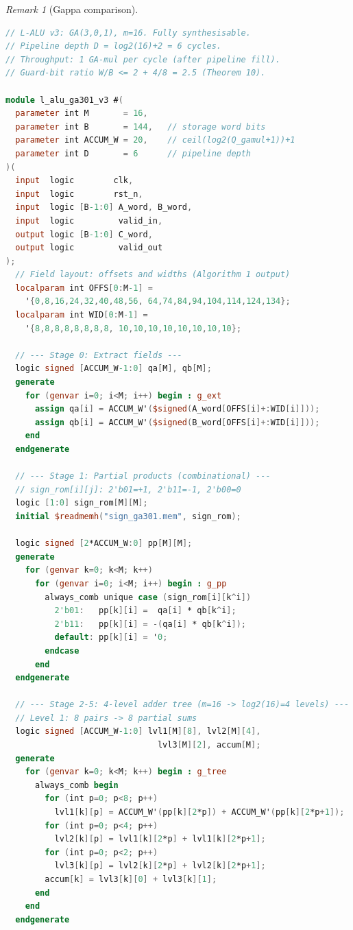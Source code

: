 \documentclass[11pt,a4paper]{article}
\theoremstyle{definition}
\theoremstyle{plain}
\theoremstyle{remark}
\newtheorem{remark}{Remark}[section]
\newcommand{\GA}{\mathbb{G}}
\begin{document}
\begin{remark}[Gappa comparison]
\begin{lstlisting}[language=Verilog,
  caption={L-ALU tile $\GA(3,0,1)$, $m=16$, pipelined, synthesisable},
  label=lst:verilog-v3]
// L-ALU v3: GA(3,0,1), m=16. Fully synthesisable.
// Pipeline depth D = log2(16)+2 = 6 cycles.
// Throughput: 1 GA-mul per cycle (after pipeline fill).
// Guard-bit ratio W/B <= 2 + 4/8 = 2.5 (Theorem 10).

module l_alu_ga301_v3 #(
  parameter int M       = 16,
  parameter int B       = 144,   // storage word bits
  parameter int ACCUM_W = 20,    // ceil(log2(Q_gamul+1))+1
  parameter int D       = 6      // pipeline depth
)(
  input  logic        clk,
  input  logic        rst_n,
  input  logic [B-1:0] A_word, B_word,
  input  logic         valid_in,
  output logic [B-1:0] C_word,
  output logic         valid_out
);
  // Field layout: offsets and widths (Algorithm 1 output)
  localparam int OFFS[0:M-1] =
    '{0,8,16,24,32,40,48,56, 64,74,84,94,104,114,124,134};
  localparam int WID[0:M-1] =
    '{8,8,8,8,8,8,8,8, 10,10,10,10,10,10,10,10};

  // --- Stage 0: Extract fields ---
  logic signed [ACCUM_W-1:0] qa[M], qb[M];
  generate
    for (genvar i=0; i<M; i++) begin : g_ext
      assign qa[i] = ACCUM_W'($signed(A_word[OFFS[i]+:WID[i]]));
      assign qb[i] = ACCUM_W'($signed(B_word[OFFS[i]+:WID[i]]));
    end
  endgenerate

  // --- Stage 1: Partial products (combinational) ---
  // sign_rom[i][j]: 2'b01=+1, 2'b11=-1, 2'b00=0
  logic [1:0] sign_rom[M][M];
  initial $readmemh("sign_ga301.mem", sign_rom);

  logic signed [2*ACCUM_W:0] pp[M][M];
  generate
    for (genvar k=0; k<M; k++)
      for (genvar i=0; i<M; i++) begin : g_pp
        always_comb unique case (sign_rom[i][k^i])
          2'b01:   pp[k][i] =  qa[i] * qb[k^i];
          2'b11:   pp[k][i] = -(qa[i] * qb[k^i]);
          default: pp[k][i] = '0;
        endcase
      end
  endgenerate

  // --- Stage 2-5: 4-level adder tree (m=16 -> log2(16)=4 levels) ---
  // Level 1: 8 pairs -> 8 partial sums
  logic signed [ACCUM_W-1:0] lvl1[M][8], lvl2[M][4],
                               lvl3[M][2], accum[M];
  generate
    for (genvar k=0; k<M; k++) begin : g_tree
      always_comb begin
        for (int p=0; p<8; p++)
          lvl1[k][p] = ACCUM_W'(pp[k][2*p]) + ACCUM_W'(pp[k][2*p+1]);
        for (int p=0; p<4; p++)
          lvl2[k][p] = lvl1[k][2*p] + lvl1[k][2*p+1];
        for (int p=0; p<2; p++)
          lvl3[k][p] = lvl2[k][2*p] + lvl2[k][2*p+1];
        accum[k] = lvl3[k][0] + lvl3[k][1];
      end
    end
  endgenerate


\end{lstlisting}
\end{remark}
\end{document}
